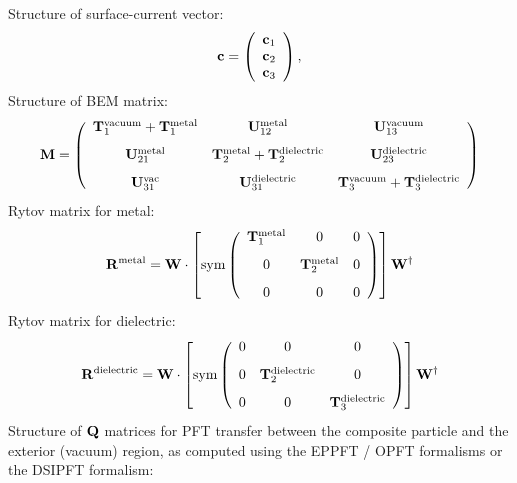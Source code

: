 \documentclass[letterpaper]{article}
\begin{document}
\noindent Structure of surface-current vector:
$$ \mathbf{c}=
   \left(\begin{array}{c} \mathbf{c}_1 \\ \mathbf{c}_2 \\ \mathbf{c}_3 \end{array}\right),
$$
Structure of BEM matrix:
$$ \mathbf{M}
    =
   \left(\begin{array}{ccc}
     \mathbf{T}_{1}^{\hbox{\scriptsize{vacuum}}} + \mathbf{T}_{1}^{\hbox{\scriptsize{metal}}}
   & \mathbf{U}_{12}^{\hbox{\scriptsize{metal}}}
   & \mathbf{U}_{13}^{\hbox{\scriptsize{vacuum}}}
\\[8pt]
     \mathbf{U}_{21}^{\hbox{\scriptsize{metal}}}
   & \mathbf{T}_{2}^{\hbox{\scriptsize{metal}}} + \mathbf{T}_{2}^{\hbox{\scriptsize{dielectric}}}
   & \mathbf{U}_{23}^{\hbox{\scriptsize{dielectric}}}
\\[8pt]
     \mathbf{U}_{31}^{\hbox{\scriptsize{vac}}}
   & \mathbf{U}_{31}^{\hbox{\scriptsize{dielectric}}}
   & \mathbf{T}_{3}^{\hbox{\scriptsize{vacuum}}} + \mathbf{T}_{3}^{\hbox{\scriptsize{dielectric}}}
   \end{array}\right)
$$
Rytov matrix for metal: 
$$ \mathbf{R}^{\hbox{\scriptsize{metal}}}
    = \mathbf{W}\cdot
   \left[
   \text{sym}
   \left(\begin{array}{ccc}
     \mathbf{T}_{1}^{\hbox{\scriptsize{metal}}}
   & 0
   & 0
\\[8pt]
     0
   & \mathbf{T}_{2}^{\hbox{\scriptsize{metal}}} 
   & 0
\\[8pt]
     0 
   & 0
   & 0
   \end{array}\right)
   \right]
   \mathbf{W}^\dagger
$$
Rytov matrix for dielectric: 
$$ \mathbf{R}^{\hbox{\scriptsize{dielectric}}}
    = \mathbf{W}\cdot
   \left[
   \text{sym}
   \left(\begin{array}{ccc}
     0
   & 0
   & 0
\\[8pt]
     0
   & \mathbf{T}_{2}^{\hbox{\scriptsize{dielectric}}} 
   & 0
\\[8pt]
     0 
   & 0
   & \mathbf{T}_{3}^{\hbox{\scriptsize{dielectric}}} 
   \end{array}\right)
   \right]
   \mathbf{W}^\dagger
$$
Structure of $\mathbf{Q}$ matrices for PFT transfer between the 
composite particle and the exterior (vacuum) region, as
computed using the EPPFT / OPFT formalisms or the DSIPFT 
formalism:
\end{document}
